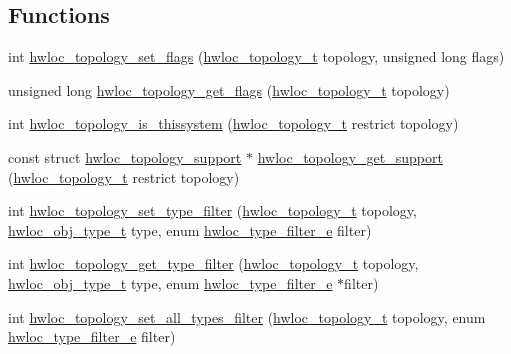 \subsection*{Functions}
\begin{DoxyCompactItemize}
\item 
int \hyperlink{a00193_gaaeed4df656979e5f16befea9d29b814b}{hwloc\+\_\+topology\+\_\+set\+\_\+flags} (\hyperlink{a00186_ga9d1e76ee15a7dee158b786c30b6a6e38}{hwloc\+\_\+topology\+\_\+t} topology, unsigned long flags)
\item 
unsigned long \hyperlink{a00193_ga09318f81c1d4713be907d64748a6f93c}{hwloc\+\_\+topology\+\_\+get\+\_\+flags} (\hyperlink{a00186_ga9d1e76ee15a7dee158b786c30b6a6e38}{hwloc\+\_\+topology\+\_\+t} topology)
\item 
int \hyperlink{a00193_ga68ffdcfd9175cdf40709801092f18017}{hwloc\+\_\+topology\+\_\+is\+\_\+thissystem} (\hyperlink{a00186_ga9d1e76ee15a7dee158b786c30b6a6e38}{hwloc\+\_\+topology\+\_\+t} restrict topology)
\item 
const struct \hyperlink{a00306}{hwloc\+\_\+topology\+\_\+support} $\ast$ \hyperlink{a00193_gab8c76173c4a8ce1a9a9366012b1388e6}{hwloc\+\_\+topology\+\_\+get\+\_\+support} (\hyperlink{a00186_ga9d1e76ee15a7dee158b786c30b6a6e38}{hwloc\+\_\+topology\+\_\+t} restrict topology)
\item 
int \hyperlink{a00193_gad894e70f15f8d4aada7be8d1aba38b7e}{hwloc\+\_\+topology\+\_\+set\+\_\+type\+\_\+filter} (\hyperlink{a00186_ga9d1e76ee15a7dee158b786c30b6a6e38}{hwloc\+\_\+topology\+\_\+t} topology, \hyperlink{a00184_gacd37bb612667dc437d66bfb175a8dc55}{hwloc\+\_\+obj\+\_\+type\+\_\+t} type, enum \hyperlink{a00193_ga9a5a1f0140cd1952544477833733195b}{hwloc\+\_\+type\+\_\+filter\+\_\+e} filter)
\item 
int \hyperlink{a00193_ga137ad1178f7a79f2383974d983083401}{hwloc\+\_\+topology\+\_\+get\+\_\+type\+\_\+filter} (\hyperlink{a00186_ga9d1e76ee15a7dee158b786c30b6a6e38}{hwloc\+\_\+topology\+\_\+t} topology, \hyperlink{a00184_gacd37bb612667dc437d66bfb175a8dc55}{hwloc\+\_\+obj\+\_\+type\+\_\+t} type, enum \hyperlink{a00193_ga9a5a1f0140cd1952544477833733195b}{hwloc\+\_\+type\+\_\+filter\+\_\+e} $\ast$filter)
\item 
int \hyperlink{a00193_ga9eb8dc3b106f84921bf5789101e97e24}{hwloc\+\_\+topology\+\_\+set\+\_\+all\+\_\+types\+\_\+filter} (\hyperlink{a00186_ga9d1e76ee15a7dee158b786c30b6a6e38}{hwloc\+\_\+topology\+\_\+t} topology, enum \hyperlink{a00193_ga9a5a1f0140cd1952544477833733195b}{hwloc\+\_\+type\+\_\+filter\+\_\+e} filter)
\item 

\end{DoxyCompactItemize}
